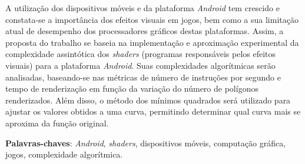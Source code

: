 \begin{resumo}

 A utilização dos dispositivos móveis e da plataforma \textit{Android} tem crescido e constata-se a importância dos efeitos visuais em jogos, bem como a sua limitação atual de desempenho dos processadores gráficos destas plataformas. Assim, a proposta do trabalho se baseia na implementação e aproximação experimental da complexidade assintótica dos \textit{shaders} (programas responsáveis pelos efeitos visuais) para a plataforma \textit{Android}. Suas complexidades algorítmicas serão analisadas, baseando-se nas métricas de número de instruções por segundo e tempo de renderização em função da variação do número de polígonos renderizados. Além disso, o método dos mínimos quadrados será utilizado para ajustar os valores obtidos a uma curva, permitindo determinar qual curva mais se aproxima da função original.

 \vspace{\onelineskip}
    
 \noindent
 \textbf{Palavras-chaves}: \textit{Android}, \textit{shaders}, dispositivos móveis, computação gráfica, jogos, complexidade algorítmica. 
\end{resumo}
